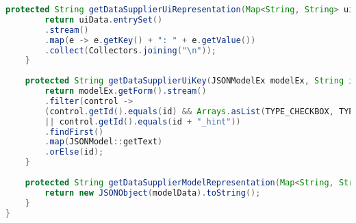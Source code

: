 \begin{lstlisting}[language=Java]
	protected String getDataSupplierUiRepresentation(Map<String, String> uiData) {
		return uiData.entrySet()
		.stream()
		.map(e -> e.getKey() + ": " + e.getValue())
		.collect(Collectors.joining("\n"));
	}
	
	protected String getDataSupplierUiKey(JSONModelEx modelEx, String id) {
		return modelEx.getForm().stream()
		.filter(control ->
		(control.getId().equals(id) && Arrays.asList(TYPE_CHECKBOX, TYPE_RADIO).contains(control.getType()))
		|| control.getId().equals(id + "_hint"))
		.findFirst()
		.map(JSONModel::getText)
		.orElse(id);
	}
	
	protected String getDataSupplierModelRepresentation(Map<String, String> modelData) {
		return new JSONObject(modelData).toString();
	}
}
	
\end{lstlisting}

